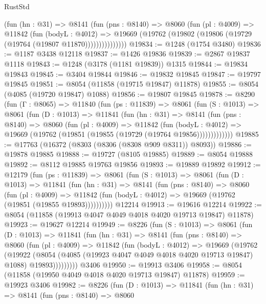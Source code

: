 \begin{lexlean}{RustStd}
\begin{coremodule}
              (fun (hn : @31) =>
              @8141
                (fun (pns : @8140) =>
                @8060
                  (fun (pl : @4009) =>
                  @11842
                    (fun (bodyL : @4012) =>
                    @19669 (@19762 (@19802 (@19806 (@19729 (@19764 (@19807 @11870)))))))))))))))
@19834 := @1248 (@1754 @3480)
@19836 := @1187 @3438 @12118
@19837 := @1426 @19836
@19839 := @2867 @19837 @1118
@19843 := @1248 (@3178 (@1181 @19839)) @1315
@19844 := @19834 @19843
@19845 := @3404 @19844
@19846 := @19832 @19845
@19847 := @19797 @19845
@19851 := @8054 (@11858 (@19715 @19847) @11878)
@19855 := @8054 (@4085 (@19720 @19847) @1088)
@19856 := @19807 @19845
@19878 := @8290
    (fun (Γ : @8065) =>
    @11840
      (fun (ps : @11839) =>
      @8061
        (fun (S : @1013) =>
        @8061
          (fun (D : @1013) =>
          @11841
            (fun (hn : @31) =>
            @8141
              (fun (pns : @8140) =>
              @8060
                (fun (pl : @4009) =>
                @11842
                  (fun (bodyL : @4012) =>
                  @19669 (@19762 (@19851 (@19855 (@19729 (@19764 @19856)))))))))))))
@19885 := @17763 (@16372 (@8303 (@8306 (@8308 @909 @8311)) @8093))
@19886 := @19878 @19885
@19888 := @19727 (@8105 @19885)
@19889 := @8054 @19888
@19892 := @8112 @19885 @19763 @19856
@19893 := @19889 @19892
@19912 := @12179
    (fun (ps : @11839) =>
    @8061
      (fun (S : @1013) =>
      @8061
        (fun (D : @1013) =>
        @11841
          (fun (hn : @31) =>
          @8141
            (fun (pns : @8140) =>
            @8060
              (fun (pl : @4009) =>
              @11842 (fun (bodyL : @4012) => @19669 (@19762 (@19851 (@19855 @19893))))))))))
    @12214
@19913 := @19616 @12214
@19922 := @8054 (@11858 (@19913 @4047 @4049 @4018 @4020 @19713 @19847) @11878)
@19923 := @19627 @12214
@19949 := @8226
    (fun (S : @1013) =>
    @8061
      (fun (D : @1013) =>
      @11841
        (fun (hn : @31) =>
        @8141
          (fun (pns : @8140) =>
          @8060
            (fun (pl : @4009) =>
            @11842
              (fun (bodyL : @4012) =>
              @19669
                (@19762
                  (@19922
                    (@8054
                      (@4085 (@19923 @4047 @4049 @4018 @4020 @19713 @19847) @1088)
                      @19893)))))))))
    @3406
@19950 := @19913 @3406
@19958 := @8054 (@11858 (@19950 @4049 @4018 @4020 @19713 @19847) @11878)
@19959 := @19923 @3406
@19982 := @8226
    (fun (D : @1013) =>
    @11841
      (fun (hn : @31) =>
      @8141
        (fun (pns : @8140) =>
        @8060

\end{coremodule}
\end{lexlean}
